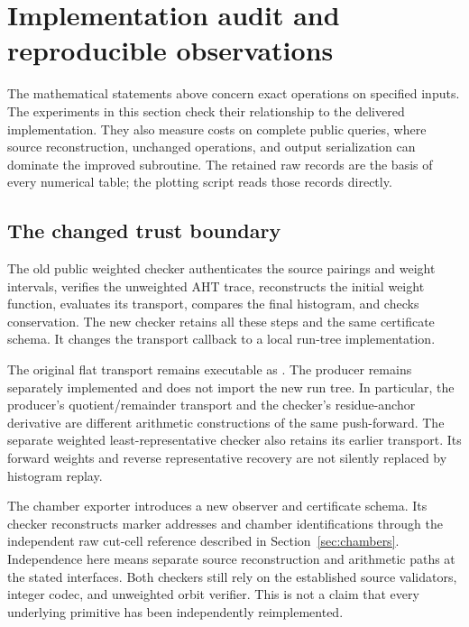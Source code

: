 \section{Implementation audit and reproducible observations}
\label{sec:validation}

The mathematical statements above concern exact operations on specified
inputs. The experiments in this section check their relationship to the
delivered implementation. They also measure costs on complete public
queries, where source reconstruction, unchanged operations, and output
serialization can dominate the improved subroutine. The retained raw
records are the basis of every numerical table; the plotting script reads
those records directly.

\subsection{The changed trust boundary}

The old public weighted checker authenticates the source pairings and
weight intervals, verifies the unweighted AHT trace, reconstructs the
initial weight function, evaluates its transport, compares the final
histogram, and checks conservation. The new checker retains all these
steps and the same certificate schema. It changes the transport callback
to a local run-tree implementation.

The original flat transport remains executable as
. The producer remains
separately implemented and does not import the new run tree. In particular,
the producer's quotient/remainder transport and the checker's
residue-anchor derivative are different arithmetic constructions of the
same push-forward. The separate weighted least-representative checker
also retains its earlier transport. Its forward weights and reverse
representative recovery are not silently replaced by histogram replay.

The chamber exporter introduces a new observer and certificate schema.
Its checker reconstructs marker addresses and chamber identifications
through the independent raw cut-cell reference described in
Section~\ref{sec:chambers}. Independence here means separate source
reconstruction and arithmetic paths at the stated interfaces. Both
checkers still rely on the established source validators, integer codec,
and unweighted orbit verifier. This is not a claim that every underlying
primitive has been independently reimplemented.

